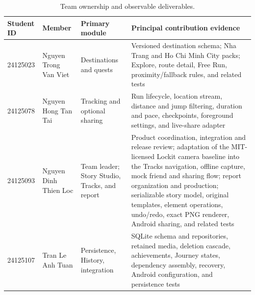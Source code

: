 \begin{table}[htbp]
\centering
\footnotesize
\begin{tabularx}{\textwidth}{@{}p{18mm}p{34mm}p{34mm}X@{}}
\toprule
\textbf{Student ID} & \textbf{Member} & \textbf{Primary module} &
\textbf{Principal contribution evidence} \\
\midrule
24125023 & Nguyen Trong Van Viet & Destinations and quests & Versioned destination
schema; Nha Trang and Ho Chi Minh City packs; Explore, route detail, Free Run,
proximity/fallback rules, and related tests \\
24125078 & Nguyen Hong Tan Tai & Tracking and optional sharing & Run lifecycle,
location stream, distance and jump filtering, duration and pace, checkpoints,
foreground settings, and live-share adapter \\
24125093 & Nguyen Dinh Thien Loc & Team leader; Story Studio, Tracks, and report &
Product coordination, integration and release review; adaptation of the
MIT-licensed Lockit camera baseline into the Tracks navigation, offline capture,
mock friend and sharing flow; report organization and production; serializable
story model, original templates, element operations, undo/redo, exact PNG
renderer, Android sharing, and related tests \\
24125107 & Tran Le Anh Tuan & Persistence, History, integration & SQLite schema and
repositories, retained media, deletion cascade, achievements, Journey states,
dependency assembly, recovery, Android configuration, and persistence tests \\
\bottomrule
\end{tabularx}
\caption{Team ownership and observable deliverables.}
\end{table}
